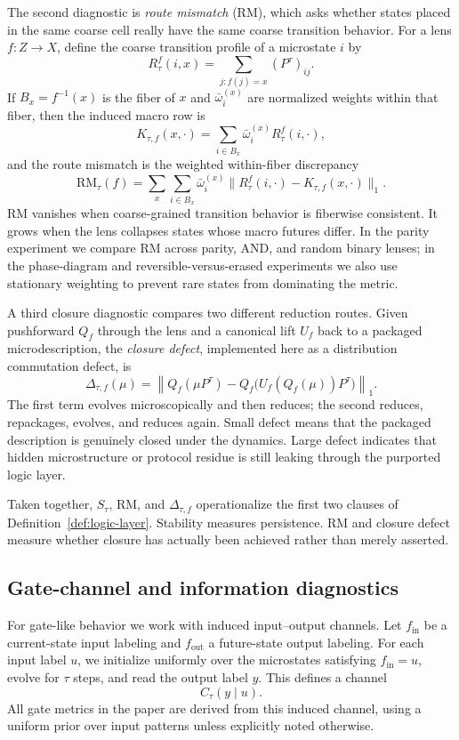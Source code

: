 \documentclass[11pt]{article}
\theoremstyle{definition}
\begin{document}
The second diagnostic is \emph{route mismatch} (RM), which asks whether states placed in the same coarse cell really have the same coarse transition behavior. For a lens \(f : Z \to X\), define the coarse transition profile of a microstate \(i\) by
\[
R_\tau^f(i,x)
=
\sum_{j : f(j)=x} (P^\tau)_{ij}.
\]
If \(B_x=f^{-1}(x)\) is the fiber of \(x\) and \(\bar\omega_i^{(x)}\) are normalized weights within that fiber, then the induced macro row is
\[
K_{\tau,f}(x,\cdot)
=
\sum_{i\in B_x} \bar\omega_i^{(x)} R_\tau^f(i,\cdot),
\]
and the route mismatch is the weighted within-fiber discrepancy
\[
\mathrm{RM}_\tau(f)
=
\sum_x \sum_{i\in B_x}
\bar\omega_i^{(x)}
\bigl\|
R_\tau^f(i,\cdot)-K_{\tau,f}(x,\cdot)
\bigr\|_1.
\]
RM vanishes when coarse-grained transition behavior is fiberwise consistent. It grows when the lens collapses states whose macro futures differ. In the parity experiment we compare RM across parity, AND, and random binary lenses; in the phase-diagram and reversible-versus-erased experiments we also use stationary weighting to prevent rare states from dominating the metric.

A third closure diagnostic compares two different reduction routes. Given pushforward \(Q_f\) through the lens and a canonical lift \(U_f\) back to a packaged microdescription, the \emph{closure defect}, implemented here as a distribution commutation defect, is
\[
\Delta_{\tau,f}(\mu)
=
\left\|
Q_f(\mu P^\tau)
-
Q_f\!\bigl(U_f(Q_f(\mu))P^\tau\bigr)
\right\|_1.
\]
The first term evolves microscopically and then reduces; the second reduces, repackages, evolves, and reduces again. Small defect means that the packaged description is genuinely closed under the dynamics. Large defect indicates that hidden microstructure or protocol residue is still leaking through the purported logic layer.

Taken together, \(S_\tau\), RM, and \(\Delta_{\tau,f}\) operationalize the first two clauses of Definition~\ref{def:logic-layer}. Stability measures persistence. RM and closure defect measure whether closure has actually been achieved rather than merely asserted.

\subsection{Gate-channel and information diagnostics}

For gate-like behavior we work with induced input--output channels. Let \(f_{\mathrm{in}}\) be a current-state input labeling and \(f_{\mathrm{out}}\) a future-state output labeling. For each input label \(u\), we initialize uniformly over the microstates satisfying \(f_{\mathrm{in}}=u\), evolve for \(\tau\) steps, and read the output label \(y\). This defines a channel
\[
C_\tau(y\mid u).
\]
All gate metrics in the paper are derived from this induced channel, using a uniform prior over input patterns unless explicitly noted otherwise.
\end{document}
